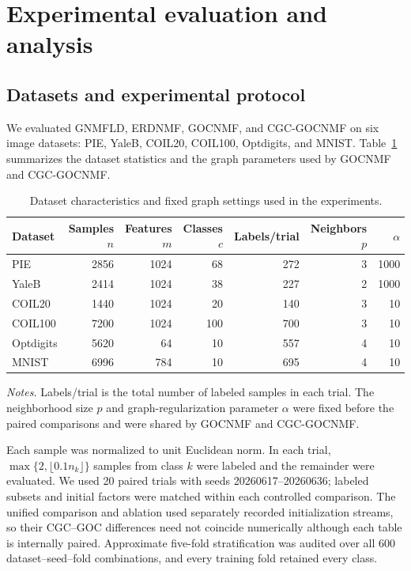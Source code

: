 \documentclass[11pt]{article}
\theoremstyle{remark}
\begin{document}
\section{Experimental evaluation and analysis}
\label{sec:experiments}

\subsection{Datasets and experimental protocol}

We evaluated GNMFLD, ERDNMF, GOCNMF, and CGC-GOCNMF on six image datasets: PIE, YaleB, COIL20, COIL100, Optdigits, and MNIST. Table~\ref{tab:datasets} summarizes the dataset statistics and the graph parameters used by GOCNMF and CGC-GOCNMF.

\begin{table}[!t]
\centering
\caption{Dataset characteristics and fixed graph settings used in the experiments.}
\label{tab:datasets}
\small
\begin{tabular*}{\textwidth}{@{\extracolsep{\fill}}lrrrrrr@{}}
\toprule
Dataset & Samples $n$ & Features $m$ & Classes $c$ & Labels/trial & Neighbors $p$ & $\alpha$ \\
\midrule
PIE & 2856 & 1024 & 68 & 272 & 3 & 1000 \\
YaleB & 2414 & 1024 & 38 & 227 & 2 & 1000 \\
COIL20 & 1440 & 1024 & 20 & 140 & 3 & 10 \\
COIL100 & 7200 & 1024 & 100 & 700 & 3 & 10 \\
Optdigits & 5620 & 64 & 10 & 557 & 4 & 10 \\
MNIST & 6996 & 784 & 10 & 695 & 4 & 10 \\
\bottomrule
\end{tabular*}
\vspace{1.5pt}

\parbox{\textwidth}{\footnotesize\emph{Notes.} Labels/trial is the total number of labeled samples in each trial. The neighborhood size $p$ and graph-regularization parameter $\alpha$ were fixed before the paired comparisons and were shared by GOCNMF and CGC-GOCNMF.}
\end{table}

Each sample was normalized to unit Euclidean norm. In each trial, $\max\{2,\lfloor0.1n_k\rfloor\}$ samples from class $k$ were labeled and the remainder were evaluated. We used 20 paired trials with seeds 20260617--20260636; labeled subsets and initial factors were matched within each controlled comparison. The unified comparison and ablation used separately recorded initialization streams, so their CGC--GOC differences need not coincide numerically although each table is internally paired. Approximate five-fold stratification was audited over all 600 dataset--seed--fold combinations, and every training fold retained every class.
\end{document}
